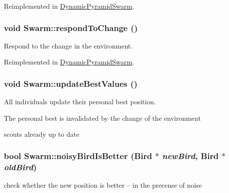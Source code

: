 Reimplemented in \hyperlink{classDynamicPyramidSwarm_ae6437872484ff8baa443d3c2beee820}{DynamicPyramidSwarm}.\hypertarget{classSwarm_f98488b9ca17c07c89a591040f360db6}{
\subsubsection{\setlength{\rightskip}{0pt plus 5cm}void Swarm::respondToChange ()}}
\label{classSwarm_f98488b9ca17c07c89a591040f360db6}


Respond to the change in the environment. 



Reimplemented in \hyperlink{classDynamicPyramidSwarm_fbbb06914f9500603fee564415d976ae}{DynamicPyramidSwarm}.\hypertarget{classSwarm_68f5ddc7a3335954f42cc01366ab374d}{
\subsubsection{\setlength{\rightskip}{0pt plus 5cm}void Swarm::updateBestValues ()}}
\label{classSwarm_68f5ddc7a3335954f42cc01366ab374d}


All individuals update their personal best position. 

The personal best is invalidated by the change of the environment 

scouts already up to date \hypertarget{classSwarm_37d9b1abc4dac92ed426bcc50912fc76}{
\subsubsection{\setlength{\rightskip}{0pt plus 5cm}bool Swarm::noisyBirdIsBetter ({\bf Bird} $\ast$ {\em newBird}, \/  {\bf Bird} $\ast$ {\em oldBird})}}
\label{classSwarm_37d9b1abc4dac92ed426bcc50912fc76}


check whether the new position is better -- in the precense of noise 


